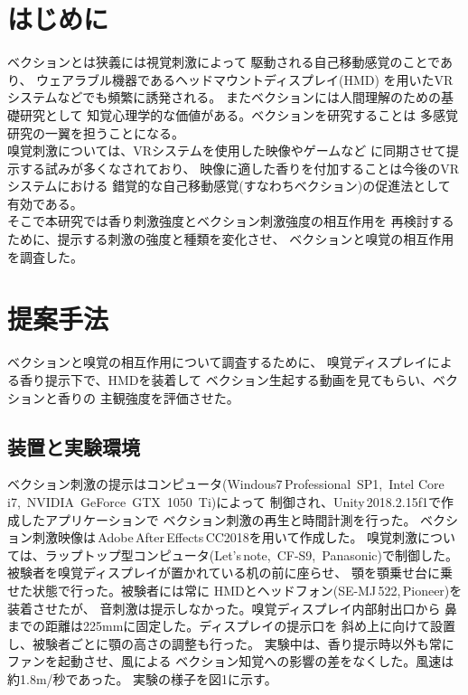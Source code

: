 \documentclass[uplatex]{jsarticle}   %
\begin{document}

\vspace{3mm}

\setcounter{page}{x}



\section{はじめに}
ベクションとは狭義には視覚刺激によって
駆動される自己移動感覚のことであり、
ウェアラブル機器であるヘッドマウントディスプレイ(HMD)
を用いたVRシステムなどでも頻繁に誘発される。
またベクションには人間理解のための基礎研究として
知覚心理学的な価値がある。ベクションを研究することは
多感覚研究の一翼を担うことになる。\\
嗅覚刺激については、VRシステムを使用した映像やゲームなど
に同期させて提示する試みが多くなされており、
映像に適した香りを付加することは今後のVRシステムにおける
錯覚的な自己移動感覚(すなわちベクション)の促進法として有効である。\\
そこで本研究では香り刺激強度とベクション刺激強度の相互作用を
再検討するために、提示する刺激の強度と種類を変化させ、
ベクションと嗅覚の相互作用を調査した。

\section{提案手法}
ベクションと嗅覚の相互作用について調査するために、
嗅覚ディスプレイによる香り提示下で、HMDを装着して
ベクション生起する動画を見てもらい、ベクションと香りの
主観強度を評価させた。

\subsection{装置と実験環境}
ベクション刺激の提示はコンピュータ(Windous7\,Professional\,
SP1,\, Intel Core i7,\, NVIDIA\, GeForce\, GTX\, 1050\, Ti)によって
制御され、Unity\,2018.2.15f1で作成したアプリケーションで
ベクション刺激の再生と時間計測を行った。
ベクション刺激映像は\,Adobe\,After\,Effects\,CC2018を用いて作成した。
嗅覚刺激については、ラップトップ型コンピュータ(Let's\,note,\, CF-S9,\,
Panasonic)で制御した。\\
被験者を嗅覚ディスプレイが置かれている机の前に座らせ、
顎を顎乗せ台に乗せた状態で行った。被験者には常に
HMDとヘッドフォン(SE-MJ\,522,\,Pioneer)を装着させたが、
音刺激は提示しなかった。嗅覚ディスプレイ内部射出口から
鼻までの距離は225mmに固定した。ディスプレイの提示口を
斜め上に向けて設置し、被験者ごとに顎の高さの調整も行った。
実験中は、香り提示時以外も常にファンを起動させ、風による
ベクション知覚への影響の差をなくした。風速は約1.8m/秒であった。
実験の様子を図1に示す。
\end{document}
